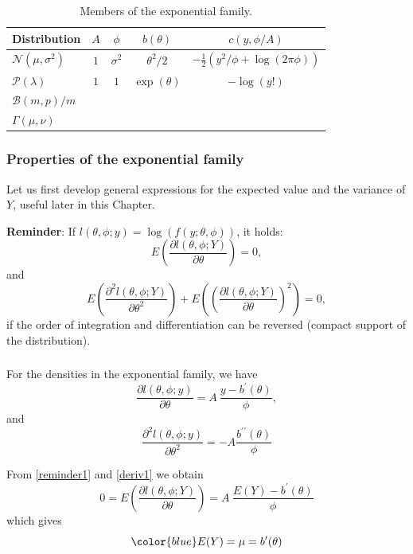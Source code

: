 \documentclass{beamer}
\newcommand{\bs}{\bigskip}
\begin{document}
\begin{frame}
\frametitle{}

\begin{table}[tbp]
  \centering
  \begin{tabular}{|l|c|c|c|c|}
   \hline
  Distribution & $A$ & $\phi$ & $b(\theta)$ & $c(y, \phi/A)$\\
  \hline
   ${\mathcal N}(\mu,\sigma^2)$ & $1$ & $\sigma^2$ &  $\theta^2/2$ & $-\frac{1}{2} (y^2/\phi + \log(2 \pi \phi))$ \\
   ${\mathcal P}(\lambda)$ & $1$ & $1$ & $\exp(\theta)$ & $-\log(y!)$ \\
   ${\mathcal B}(m,p)/m$ & & & & \\
    $\Gamma(\mu,\nu)$ & & & &\\
   \hline
  \end{tabular}
  \caption{Members of the exponential family.}
  \label{exponential.table}
\end{table}
\end{frame}

\begin{frame}
\frametitle{Properties of the exponential family}

Let us first develop general expressions for the expected value and the variance
of $Y$, useful later in this Chapter.

\bs

\textbf{Reminder}: If $l(\theta, \phi;y) = \log(f(y; \theta,\phi))$, it holds:
\begin{equation}
\label{reminder1}
E\left(\frac{\partial l(\theta, \phi;Y)}{\partial \theta}\right)=0,
\end{equation}
and
\begin{equation}
\label{reminder2}
E\left(\frac{\partial^2 l(\theta, \phi;Y)}{\partial \theta^ 2}\right) +
E\left(\left(\frac{\partial l(\theta, \phi;Y)}{\partial \theta}\right)^2\right)=0,
\end{equation}
if the order of integration and differentiation can be reversed (compact support
of the distribution).
\end{frame}


\begin{frame}
\frametitle{}


For the densities in the exponential family, we have
\begin{equation}
\label{deriv1}
\frac{\partial l(\theta, \phi;y)}{\partial \theta} = A \  \frac{y -
b^{\prime}(\theta)}{\phi},  
\end{equation}
and
\begin{equation}
\label{deriv2}
\frac{\partial^2 l(\theta, \phi;y)}{\partial \theta^2} = - A \frac{b^{\prime \prime}(\theta)}{\phi}
\end{equation}

\bs
From \eqref{reminder1} and \eqref{deriv1} we obtain
$$0=E\left(\frac{\partial l(\theta, \phi;Y)}{\partial \theta}\right)=A \
\frac{E(Y) - b^{\prime}(\theta)}{\phi}$$
which gives
\bs
\begin{equation}
\label{expect.exponential}
{\color{blue}E(Y) = \mu = b^{\prime}(\theta)}
\end{equation}
\end{frame}
\end{document}
